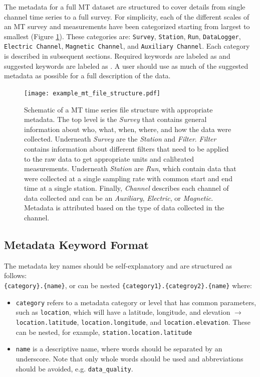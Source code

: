 \documentclass[12pt]{article}
\newcommand{\True}[0]{{\color{Red}{\textbf{True}}}}
\newcommand{\False}[0]{{\color{Teal}{\textbf{False}}}}
\begin{document}
The metadata for a full MT dataset are structured to cover details from single channel time series to a full survey. For simplicity, each of the different scales of an MT survey and measurements have been categorized starting from largest to smallest (Figure \ref{fig:example}). These categories are: \verb|Survey|, \verb|Station|, \verb|Run|, \verb|DataLogger|, \verb|Electric Channel|, \verb|Magnetic Channel|, and \verb|Auxiliary Channel|. Each category is described in subsequent sections.  Required keywords are labeled as \True\quad and suggested keywords are labeled as \False. A user should use as much of the suggested metadata as possible for a full description of the data.  

\begin{figure}[htb!]
	\centering
	\texttt{[image: example\_mt\_file\_structure.pdf]}
	\caption{Schematic of a MT time series file structure with appropriate metadata. The top level is the \textit{Survey} that contains general information about who, what, when, where, and how the data were collected.  Underneath \textit{Survey} are the \textit{Station} and \textit{Filter}.  \textit{Filter} contains information about different filters that need to be applied to the raw data to get appropriate units and calibrated measurements.  Underneath \textit{Station} are \textit{Run}, which contain data that were collected at a single sampling rate with common start and end time at a single station. Finally, \textit{Channel} describes each channel of data collected and can be an \textit{Auxiliary}, \textit{Electric}, or \textit{Magnetic}.  Metadata is attributed based on the type of data collected in the channel.}
	\label{fig:example}
\end{figure}

\subsection{Metadata Keyword Format}

The metadata key names should be self-explanatory and are structured as follows:\\ \verb|{category}.{name}|, or can be nested \verb|{category1}.{categroy2}.{name}| where:
\begin{itemize}
	\item \verb|category| refers to a metadata category or level that has common parameters, such as \verb|location|, which will have a latitude, longitude, and elevation $\longrightarrow$ \verb|location.latitude|, \verb|location.longitude|, and \verb|location.elevation|.  These can be nested, for example, \verb|station.location.latitude|
	\item \verb|name| is a descriptive name, where words should be separated by an underscore. Note that only whole words should be used and abbreviations should be avoided, e.g. \verb|data_quality|.  
\end{itemize}  
\end{document}
